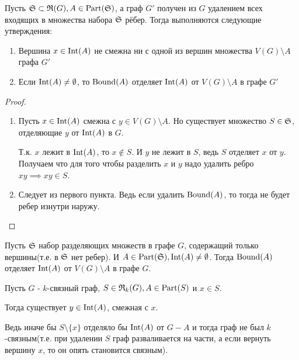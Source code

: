 \begin{thm}[Теорема 0.1] \label{theorem:0_1}
	Пусть $\S \subset \R(G), A \in \Part(\S)$, а граф  $G'$ получен из  $G$ удалением всех входящих в множества набора  $\S$ рёбер.
	Тогда выполняются следующие утверждения:
	 \begin{enumerate}
		 \item Вершина $x \in \Int(A)$ не смежна ни с одной из вершин множества  $V(G) \setminus A$ графа  $G'$
		\item Если  $\Int(A) \neq \emptyset$, то  $\Bound(A)$ отделяет  $\Int(A)$ от $V(G) \setminus A$ в графе  $G'$
	\end{enumerate}
\end{thm}
\begin{proof}
	\begin{enumerate}
		\item Пусть $x \in \Int(A)$ смежна с  $y \in V(G) \setminus A$.
			Но существует множество  $S \in \S$, отделяющие  $y$ от  $\Int(A)$ в  $G$.

			Т.к. $x$ лежит в $\Int(A)$, то  $x \not \in S$.
			И $y$ не лежит в  $S$, ведь  $S$ отделяет  $x$ от  $y$.
			Получаем что для того чтобы разделить $x$ и  $y$ надо удалить ребро  $xy \implies xy \in S$.

		\item Следует из первого пункта. Ведь если удалить $\Bound(A)$, то тогда не будет ребер изнутри наружу.
	\end{enumerate}
\end{proof}

\begin{crly}[Следствие 1]\label{corollary:0_1}
	Пусть $\S$ набор разделяющих множеств в графе  $G$, содержащий только вершины(т.е. в $\S$ нет ребер).
	И $A \in \Part(\S), \Int(A) \neq \emptyset$.
	Тогда  $\Bound(A)$ отделяет $\Int(A)$ от $V(G) \setminus A$ в графе  $G$.
\end{crly}

\begin{remrk}
	Пусть $G$ - $k$-связный граф, $S \in \R_k(G), A \in \Part(S)$ и $x \in S$.

	Тогда существует $y \in \Int(A)$, смежная с $x$.

	Ведь иначе бы $S \setminus \{x\}$ отделяло бы  $\Int(A)$ от $G - A$ и тогда граф не был $k$-связным(т.е. при удалении $S$ граф разваливается на части, а если вернуть вершину $x$, то он опять становится связным).
\end{remrk}

